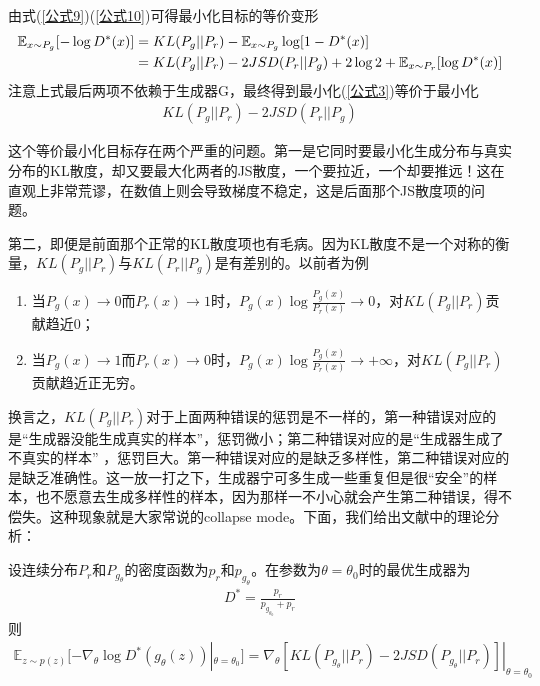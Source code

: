             由式(\ref{公式9})(\ref{公式10})可得最小化目标的等价变形
            \begin{align}
            \mathbb{E}_{x \sim P_g} [-\log D^*(x)] &= KL(P_g || P_r) - \mathbb{E}_{x \sim P_g} \log [1 - D^*(x)] \notag \\ &= KL(P_g || P_r) - 2JSD(P_r || P_g) + 2\log 2 + \mathbb{E}_{x\sim P_r}[\log D^*(x)]
            \end{align}
            注意上式最后两项不依赖于生成器G，最终得到最小化(\ref{公式3})等价于最小化
            \begin{align}
            \label{公式11}
            KL(P_g || P_r) - 2JSD(P_r || P_g)
            \end{align}
            \par
            这个等价最小化目标存在两个严重的问题。第一是它同时要最小化生成分布与真实分布的KL散度，却又要最大化两者的JS散度，一个要拉近，一个却要推远！这在直观上非常荒谬，在数值上则会导致梯度不稳定，这是后面那个JS散度项的问题。
            \par
            第二，即便是前面那个正常的KL散度项也有毛病。因为KL散度不是一个对称的衡量，$KL(P_g || P_r)$与$KL(P_r || P_g)$是有差别的。以前者为例
            \begin{enumerate}
                \item 当$P_g(x)\rightarrow 0$而$P_r(x)\rightarrow 1$时，$P_g(x) \log \frac{P_g(x)}{P_r(x)} \rightarrow 0$，对$KL(P_g || P_r)$贡献趋近0；
                \item 当$P_g(x)\rightarrow 1$而$P_r(x)\rightarrow 0$时，$P_g(x) \log \frac{P_g(x)}{P_r(x)} \rightarrow +\infty$，对$KL(P_g || P_r)$贡献趋近正无穷。
            \end{enumerate}
            \par
            换言之，$KL(P_g || P_r)$对于上面两种错误的惩罚是不一样的，第一种错误对应的是“生成器没能生成真实的样本”，惩罚微小；第二种错误对应的是“生成器生成了不真实的样本” ，惩罚巨大。第一种错误对应的是缺乏多样性，第二种错误对应的是缺乏准确性。这一放一打之下，生成器宁可多生成一些重复但是很“安全”的样本，也不愿意去生成多样性的样本，因为那样一不小心就会产生第二种错误，得不偿失。这种现象就是大家常说的collapse mode。下面，我们给出文献\cite{2017.Arjovsky}中的理论分析：
            \begin{theorem}[Theorem 2.5]
            设连续分布$P_r$和$P_{g_\theta}$的密度函数为$p_r$和$p_{g_\theta}$。在参数为$\theta=\theta_0$时的最优生成器为
            \begin{align*}
            D^*=\frac{p_r}{p_{g_{\theta_0}}+p_r}
            \end{align*}
            则
            \begin{align*}
            \mathbb{E}_{z\sim p(z)}[-\nabla _\theta\log D^*(g_\theta(z))|_{\theta=\theta_0}] = \nabla_\theta[KL(P_{g_\theta}||P_r) - 2JSD(P_{g_\theta}||P_r)]|_{\theta=\theta_0}
            \end{align*}
            \end{theorem}
